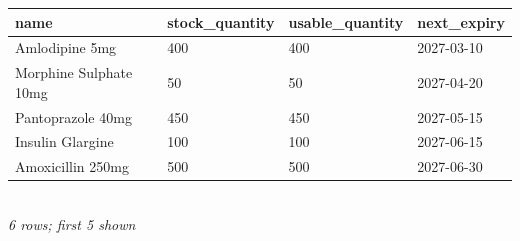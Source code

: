 {\scriptsize\setlength{\tabcolsep}{2.5pt}\begin{tabular}{llll}\toprule
\textbf{name} & \textbf{stock\_quantity} & \textbf{usable\_quantity} & \textbf{next\_expiry} \\\midrule
Amlodipine 5mg & 400 & 400 & 2027-03-10 \\
Morphine Sulphate 10mg & 50 & 50 & 2027-04-20 \\
Pantoprazole 40mg & 450 & 450 & 2027-05-15 \\
Insulin Glargine & 100 & 100 & 2027-06-15 \\
Amoxicillin 250mg & 500 & 500 & 2027-06-30 \\
\bottomrule\end{tabular}}\\[-1pt]{\tiny\itshape 6 rows; first 5 shown}
